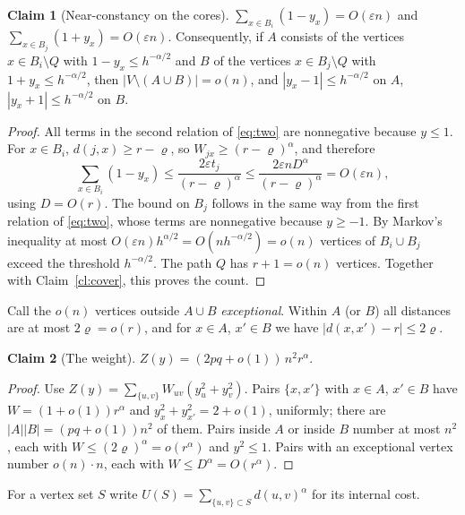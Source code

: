 \documentclass[11pt,a4paper]{article}
\theoremstyle{definition}
\newtheorem{claim}{Claim}
\newcommand{\eps}{\varepsilon}
\begin{document}
\begin{claim}[Near-constancy on the cores]\label{cl:cores}
$\sum_{x\in B_i}(1-y_x)=O(\eps n)$ and $\sum_{x\in B_j}(1+y_x)=O(\eps n)$. Consequently, if $A$ consists of the vertices $x\in B_i\setminus Q$ with $1-y_x\le h^{-\alpha/2}$ and $B$ of the vertices $x\in B_j\setminus Q$ with $1+y_x\le h^{-\alpha/2}$, then $|V\setminus(A\cup B)|=o(n)$, and $|y_x-1|\le h^{-\alpha/2}$ on $A$, $|y_x+1|\le h^{-\alpha/2}$ on $B$.
\end{claim}
\begin{proof}
All terms in the second relation of \eqref{eq:two} are nonnegative because $y\le1$. For $x\in B_i$, $d(j,x)\ge r-\varrho$, so $W_{jx}\ge(r-\varrho)^\alpha$, and therefore
\[
 \sum_{x\in B_i}(1-y_x)\le\frac{2\eps t_j}{(r-\varrho)^\alpha}\le\frac{2\eps nD^\alpha}{(r-\varrho)^\alpha}=O(\eps n),
\]
using $D=O(r)$. The bound on $B_j$ follows in the same way from the first relation of \eqref{eq:two}, whose terms are nonnegative because $y\ge-1$. By Markov's inequality at most $O(\eps n)h^{\alpha/2}=O(nh^{-\alpha/2})=o(n)$ vertices of $B_i\cup B_j$ exceed the threshold $h^{-\alpha/2}$. The path $Q$ has $r+1=o(n)$ vertices. Together with Claim~\ref{cl:cover}, this proves the count.
\end{proof}

Call the $o(n)$ vertices outside $A\cup B$ \emph{exceptional}. Within $A$ (or $B$) all distances are at most $2\varrho=o(r)$, and for $x\in A$, $x'\in B$ we have $|d(x,x')-r|\le2\varrho$.

\begin{claim}[The weight]\label{cl:weight}
$Z(y)=(2pq+o(1))\,n^2r^\alpha$.
\end{claim}
\begin{proof}
Use $Z(y)=\sum_{\{u,v\}}W_{uv}(y_u^2+y_v^2)$. Pairs $\{x,x'\}$ with $x\in A$, $x'\in B$ have $W=(1+o(1))r^\alpha$ and $y_x^2+y_{x'}^2=2+o(1)$, uniformly; there are $|A||B|=(pq+o(1))n^2$ of them. Pairs inside $A$ or inside $B$ number at most $n^2$, each with $W\le(2\varrho)^\alpha=o(r^\alpha)$ and $y^2\le1$. Pairs with an exceptional vertex number $o(n)\cdot n$, each with $W\le D^\alpha=O(r^\alpha)$.
\end{proof}

For a vertex set $S$ write $U(S)=\sum_{\{u,v\}\subset S}d(u,v)^\alpha$ for its internal cost.
\end{document}
